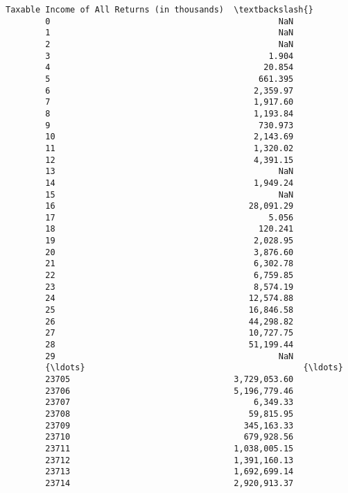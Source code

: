 \documentclass[11pt]{article}
\begin{document}
\begin{Verbatim}[commandchars=\\\{\}]
              Taxable Income of All Returns (in thousands)  \textbackslash{}
        0                                              NaN   
        1                                              NaN   
        2                                              NaN   
        3                                            1.904   
        4                                           20.854   
        5                                          661.395   
        6                                         2,359.97   
        7                                         1,917.60   
        8                                         1,193.84   
        9                                          730.973   
        10                                        2,143.69   
        11                                        1,320.02   
        12                                        4,391.15   
        13                                             NaN   
        14                                        1,949.24   
        15                                             NaN   
        16                                       28,091.29   
        17                                           5.056   
        18                                         120.241   
        19                                        2,028.95   
        20                                        3,876.60   
        21                                        6,302.78   
        22                                        6,759.85   
        23                                        8,574.19   
        24                                       12,574.88   
        25                                       16,846.58   
        26                                       44,298.82   
        27                                       10,727.75   
        28                                       51,199.44   
        29                                             NaN   
        {\ldots}                                            {\ldots}   
        23705                                 3,729,053.60   
        23706                                 5,196,779.46   
        23707                                     6,349.33   
        23708                                    59,815.95   
        23709                                   345,163.33   
        23710                                   679,928.56   
        23711                                 1,038,005.15   
        23712                                 1,391,160.13   
        23713                                 1,692,699.14   
        23714                                 2,920,913.37   

\end{Verbatim}
\end{document}

